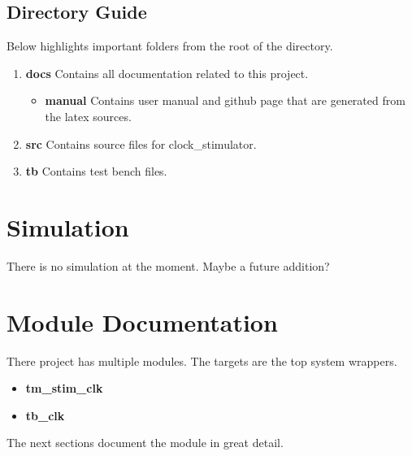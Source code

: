 \subsection{Directory Guide}

\par
Below highlights important folders from the root of the directory.

\begin{enumerate}
  \item \textbf{docs} Contains all documentation related to this project.
    \begin{itemize}
      \item \textbf{manual} Contains user manual and github page that are generated from the latex sources.
    \end{itemize}
  \item \textbf{src} Contains source files for clock\_stimulator.
  \item \textbf{tb} Contains test bench files.
\end{enumerate}

\newpage

\section{Simulation}
\par
There is no simulation at the moment. Maybe a future addition?

\newpage

\section{Module Documentation} \label{Module Documentation}

\par
There project has multiple modules. The targets are the top system wrappers.

\begin{itemize}
\item \textbf{tm\_stim\_clk}
\item \textbf{tb\_clk}
\end{itemize}
The next sections document the module in great detail.

